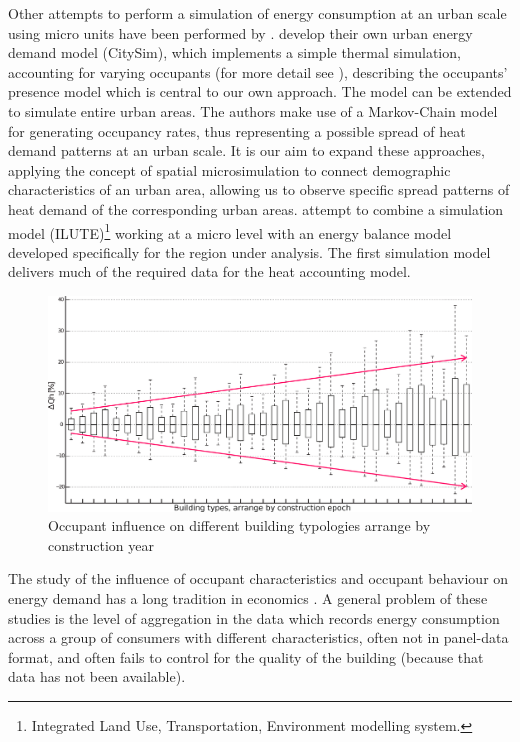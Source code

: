 \documentclass[11pt]{IJM-article}
\begin{document}
Other attempts to perform a simulation of energy consumption at an urban scale
using micro units have been performed by .  \citeauthor{Haldi.2011} develop their own urban energy demand
model (CitySim), which implements a simple thermal simulation, accounting for
varying occupants (for more detail see ), describing the occupants' presence model which is central to our
own approach. The model can be extended to simulate entire urban areas.  The
authors make use of a Markov-Chain model for generating occupancy rates, thus
representing a possible spread of heat demand patterns at an urban scale.  It
is our aim to expand these approaches, applying the concept of spatial
microsimulation to connect demographic characteristics of an urban area,
allowing us to observe specific spread patterns of heat demand of the
corresponding urban areas. \citeauthor{Chingcuanco.2012} attempt to combine a
simulation model (ILUTE)\footnote{Integrated Land Use, Transportation,
Environment modelling system.} working at a micro level with an energy balance
model developed specifically for the region under analysis. The first
simulation model delivers much of the required data for the heat accounting
model.\\

\begin{figure}[htb]
    \caption{Occupant influence on different building typologies arrange by
    	construction year}\label{fig:3} 
    \includegraphics[width=\linewidth]{FIGURES/Typ_different_dim_percentage_line.eps}
\end{figure}

The study of the influence of occupant characteristics and occupant behaviour
on energy demand has a long tradition in economics . A general problem of these
studies is the level of aggregation in the data which records energy
consumption across a group of consumers with different characteristics, often
not in panel-data format, and often fails to control for the quality of the
building (because that data has not been available).\\
\end{document}
